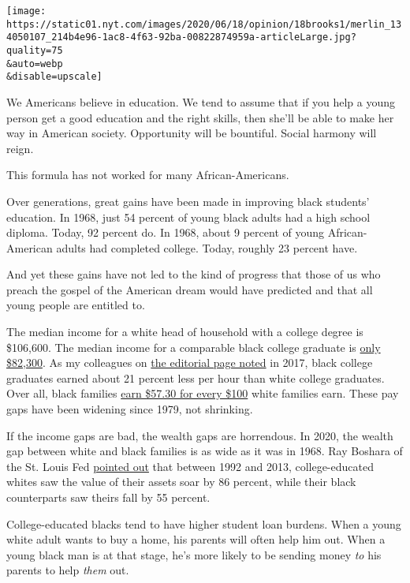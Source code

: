 \texttt{[image: https://static01.nyt.com/images/2020/06/18/opinion/18brooks1/merlin\_134050107\_214b4e96-1ac8-4f63-92ba-00822874959a-articleLarge.jpg?quality=75\\\&auto=webp\\\&disable=upscale]}

We Americans believe in education. We tend to assume that if you help a
young person get a good education and the right skills, then she'll be
able to make her way in American society. Opportunity will be bountiful.
Social harmony will reign.

This formula has not worked for many African-Americans.

Over generations, great gains have been made in improving black
students' education. In 1968, just 54 percent of young black adults had
a high school diploma. Today, 92 percent do. In 1968, about 9 percent of
young African-American adults had completed college. Today, roughly 23
percent have.

And yet these gains have not led to the kind of progress that those of
us who preach the gospel of the American dream would have predicted and
that all young people are entitled to.

The median income for a white head of household with a college degree is
\$106,600. The median income for a comparable black college graduate is
\href{https://www.pewsocialtrends.org/2016/06/27/1-demographic-trends-and-economic-well-being/}{only
\$82,300}. As my colleagues on
\href{https://www.nytimes.com/2017/09/20/opinion/college-racial-income-gap.html}{the
editorial page noted} in 2017, black college graduates earned about 21
percent less per hour than white college graduates. Over all, black
families
\href{https://www.nytimes.com/interactive/2017/09/18/upshot/black-white-wealth-gap-perceptions.html}{earn
\$57.30 for every \$100} white families earn. These pay gaps have been
widening since 1979, not shrinking.

If the income gaps are bad, the wealth gaps are horrendous. In 2020, the
wealth gap between white and black families is as wide as it was in
1968. Ray Boshara of the St. Louis Fed
\href{https://www.washingtonpost.com/business/2020/06/04/economic-divide-black-households/\%20https:/www.washingtonpost.com/opinions/black-college-graduates-are-losing-wealth-heres-what-can-help/2017/04/12/cd83ba64-1ba4-11e7-9887-1a5314b56a08_story.html?arc404=true}{pointed
out} that between 1992 and 2013, college-educated whites saw the value
of their assets soar by 86 percent, while their black counterparts saw
theirs fall by 55 percent.

College-educated blacks tend to have higher student loan burdens. When a
young white adult wants to buy a home, his parents will often help him
out. When a young black man is at that stage, he's more likely to be
sending money \emph{to} his parents to help \emph{them} out.

